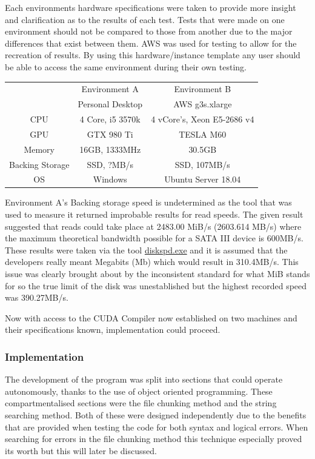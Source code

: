 Each environments hardware specifications were taken to provide more insight and clarification as to the results of each test.
Tests that were made on one environment should not be compared to those from another due to the major differences that exist between them.
\acf{AWS} was used for testing to allow for the recreation of results.
By using this hardware/instance template any user should be able to access the same environment during their own testing.

{\centering
\begin{tabular}{c | c | c}
& Environment A & Environment B \\
& Personal Desktop & AWS g3s.xlarge \\
\hline
CPU & 4 Core, i5 3570k & 4 vCore's, Xeon E5-2686 v4 \\
\hline
GPU & GTX 980 Ti & TESLA M60 \\
\hline
Memory & 16\ac{GB}, 1333MHz & 30.5\ac{GB} \\
\hline
Backing Storage & \ac{SSD}, ?\ac{MB}/s & \ac{SSD}, 107\ac{MB}/s \\
\hline
\ac{OS} & Windows & Ubuntu Server 18.04 \\
\end{tabular}
\label{tab:TestingEnv}
\par}

Environment A's Backing storage speed is undetermined as the tool that was used to measure it returned improbable results for read speeds.
The given result suggested that reads could take place at 2483.00 MiB/s (2603.614 \ac{MB}/s) where the maximum theoretical bandwidth possible for a SATA III device is 600\ac{MB}/s.
These results were taken via the tool \href{https://github.com/Microsoft/diskspd}{diskspd.exe} and it is assumed that the developers really meant Megabits (Mb) which would result in 310.4MB/s.
This issue was clearly brought about by the inconsistent standard for what MiB stands for so the true limit of the disk was unestablished but the highest recorded speed was 390.27MB/s.

Now with access to the CUDA Compiler now established on two machines and their specifications known, implementation could proceed.

\subsubsection*{Implementation}
The development of the program was split into sections that could operate autonomously, thanks to the use of object oriented programming.
These compartmentalised sections were the file chunking method and the string searching method.
Both of these were designed independently due to the benefits that are provided when testing the code for both syntax and logical errors.
When searching for errors in the file chunking method this technique especially proved its worth but this will later be discussed.

